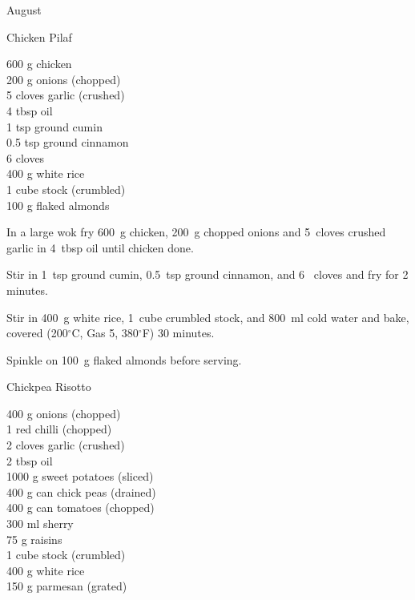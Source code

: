 \begin{menu}{August}
    \begin{recipe}{2}{Chicken Pilaf}%
		\begin{ingredients}
		600 g chicken  \\
	200 g onions (chopped) \\
	5 cloves garlic (crushed) \\
	4 tbsp oil  \\
	1 tsp ground cumin  \\
	0.5 tsp ground cinnamon  \\
	6  cloves  \\
	400 g white rice  \\
	1 cube stock (crumbled) \\
	100 g flaked almonds  \\
	
		\end{ingredients}
	
    \begin{instructions}
    \item 
        In a large wok fry
        600~g  chicken,
        200~g chopped onions
        and
        5~cloves crushed garlic
        in
        4~tbsp  oil
        until chicken done.
      \item 
        Stir in
        1~tsp  ground cumin,
        0.5~tsp  ground cinnamon,
        and
        6~  cloves
        and fry for 2 minutes.
      \item 
        Stir in
        400~g  white rice,
        1~cube crumbled stock,
        and
        800~ml  cold water
        and bake, covered (200$^{\circ}$C, Gas 5, 380$^{\circ}$F) 30 minutes.
      \item 
        Spinkle on
        100~g  flaked almonds
        before serving.
      
    \end{instructions}
    \end{recipe}%
  
    \begin{recipe}{2}{Chickpea Risotto}%
		\begin{ingredients}
		400 g onions (chopped) \\
	1  red chilli (chopped) \\
	2 cloves garlic (crushed) \\
	2 tbsp oil  \\
	1000 g sweet potatoes (sliced) \\
	400 g can chick peas (drained) \\
	400 g can tomatoes (chopped) \\
	300 ml sherry  \\
	75 g raisins  \\
	1 cube stock (crumbled) \\
	400 g white rice  \\
	150 g parmesan (grated) \\
	

\end{ingredients}
\end{recipe}
\end{menu}
